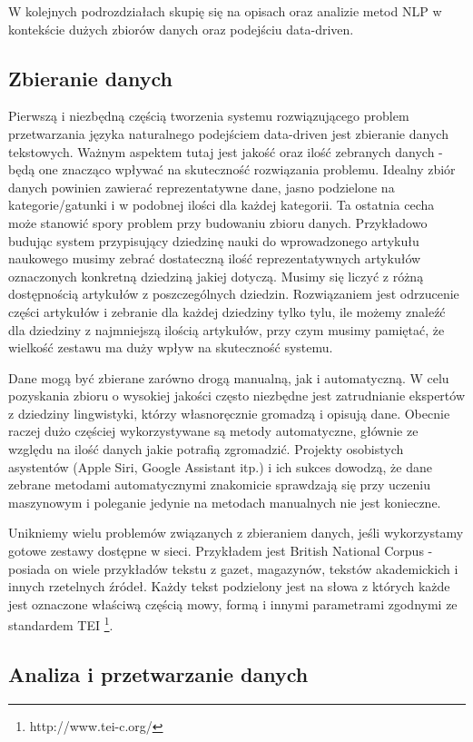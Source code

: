 W kolejnych podrozdziałach skupię się na opisach oraz analizie metod NLP w kontekście dużych zbiorów danych oraz podejściu data-driven.

\subsection{Zbieranie danych}

Pierwszą i niezbędną częścią tworzenia systemu rozwiązującego problem przetwarzania języka naturalnego podejściem data-driven jest zbieranie danych tekstowych. Ważnym aspektem tutaj jest jakość oraz ilość zebranych danych - będą one znacząco wpływać na skuteczność rozwiązania problemu. Idealny zbiór danych powinien zawierać reprezentatywne dane, jasno podzielone na kategorie/gatunki i w podobnej ilości dla każdej kategorii. Ta ostatnia cecha może stanowić spory problem przy budowaniu zbioru danych. Przykładowo budując system przypisujący dziedzinę nauki do wprowadzonego artykułu naukowego musimy zebrać dostateczną ilość reprezentatywnych artykułów oznaczonych konkretną dziedziną jakiej dotyczą. Musimy się liczyć z różną dostępnością artykułów z poszczególnych dziedzin. Rozwiązaniem jest odrzucenie części artykułów i zebranie dla każdej dziedziny tylko tylu, ile możemy znaleźć dla dziedziny z najmniejszą ilością artykułów, przy czym musimy pamiętać, że wielkość zestawu ma duży wpływ na skuteczność systemu.

Dane mogą być zbierane zarówno drogą manualną, jak i automatyczną. W celu pozyskania zbioru o wysokiej jakości często niezbędne jest zatrudnianie ekspertów z dziedziny lingwistyki, którzy własnoręcznie gromadzą i opisują dane. Obecnie raczej dużo częściej wykorzystywane są metody automatyczne, głównie ze względu na ilość danych jakie potrafią zgromadzić. Projekty osobistych asystentów (Apple Siri, Google Assistant itp.) i ich sukces dowodzą, że dane zebrane metodami automatycznymi znakomicie sprawdzają się przy uczeniu maszynowym i poleganie jedynie na metodach manualnych nie jest konieczne.

Unikniemy wielu problemów związanych z zbieraniem danych, jeśli wykorzystamy gotowe zestawy dostępne w sieci. Przykładem jest British National Corpus - posiada on wiele przykładów tekstu z gazet, magazynów, tekstów akademickich i innych rzetelnych źródeł. Każdy tekst podzielony jest na słowa z których każde jest oznaczone właściwą częścią mowy, formą i innymi parametrami zgodnymi ze standardem TEI \footnote{http://www.tei-c.org/}.


\subsection{Analiza i przetwarzanie danych}

